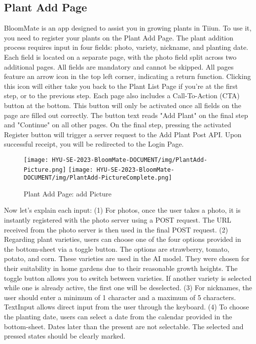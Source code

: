 \documentclass[conference, a4paper]{IEEEtran}
\begin{document}
\subsection{Plant Add Page}
BloomMate is an app designed to assist you in growing plants in Tiiun. To use it, you need to register your plants on the Plant Add Page. The plant addition process requires input in four fields: photo, variety, nickname, and planting date. Each field is located on a separate page, with the photo field split across two additional pages. All fields are mandatory and cannot be skipped. All pages feature an arrow icon in the top left corner, indicating a return function. Clicking this icon will either take you back to the Plant List Page if you're at the first step, or to the previous step. Each page also includes a Call-To-Action (CTA) button at the bottom. This button will only be activated once all fields on the page are filled out correctly. The button text reads "Add Plant" on the final step and "Continue" on all other pages. On the final step, pressing the activated Register button will trigger a server request to the Add Plant Post API. Upon successful receipt, you will be redirected to the Login Page.
    \begin{figure}[h]
    \centerline{
        \texttt{[image: HYU-SE-2023-BloomMate-DOCUMENT/img/PlantAdd-Picture.png]}
        \texttt{[image: HYU-SE-2023-BloomMate-DOCUMENT/img/PlantAdd-PictureComplete.png]}
    }
    \label{fig}
    \caption{Plant Add Page: add Picture}
    \end{figure}

Now let's explain each input: (1) For photos, once the user takes a photo, it is instantly registered with the photo server using a POST request. The URL received from the photo server is then used in the final POST request. (2) Regarding plant varieties, users can choose one of the four options provided in the bottom-sheet via a toggle button. The options are strawberry, tomato, potato, and corn. These varieties are used in the AI model. They were chosen for their suitability in home gardens due to their reasonable growth heights. The toggle button allows you to switch between varieties. If another variety is selected while one is already active, the first one will be deselected. (3) For nicknames, the user should enter a minimum of 1 character and a maximum of 5 characters. TextInput allows direct input from the user through the keyboard. (4) To choose the planting date, users can select a date from the calendar provided in the bottom-sheet. Dates later than the present are not selectable. The selected and pressed states should be clearly marked.
\end{document}
